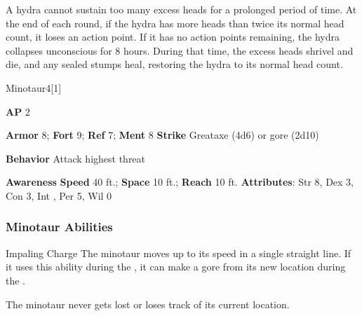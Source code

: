 A hydra cannot sustain too many excess heads for a prolonged period of time.
At the end of each round, if the hydra has more heads than twice its normal head count, it loses an action point.
If it has no action points remaining, the hydra collapses unconscious for 8 hours.
During that time, the excess heads shrivel and die, and any sealed stumps heal, restoring the hydra to its normal head count.

\begin{monsection}{Minotaur}{4}[1]
\vspace{-1em}\vspace{-1em}
\begin{spellcontent}
\begin{spelltargetinginfo}
{\textbf{AP} 2}

\pari \textbf{Armor} 8;
\textbf{Fort} 9;
\textbf{Ref} 7;
\textbf{Ment} 8
\pari \textbf{Strike} Greataxe  (4d6) or gore  (2d10)



\pari \textbf{Behavior} Attack highest threat
\end{spelltargetinginfo}
\end{spellcontent}

\begin{monsterfooter}
\pari \textbf{Awareness} 
\pari \textbf{Speed} 40 ft.;
\textbf{Space} 10 ft.;
\textbf{Reach} 10 ft.
\pari \textbf{Attributes}:
Str 8,
Dex 3,
Con 3,
Int ,
Per 5,
Wil 0
\end{monsterfooter}
\end{monsection}


\subsubsection{Minotaur Abilities}

\begin{freeability}{Impaling Charge}
The minotaur moves up to its speed in a single straight line.
If it uses this ability during the , it can make a gore  from its new location during the .
\end{freeability}

The minotaur never gets lost or loses track of its current location.

